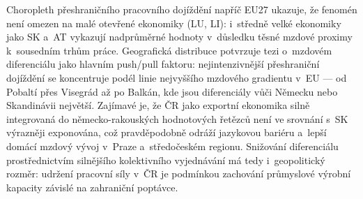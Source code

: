 Choropleth přeshraničního pracovního dojíždění napříč EU27 ukazuje, že fenomén není omezen na malé otevřené ekonomiky (LU, LI): i~středně velké ekonomiky jako SK a~AT vykazují nadprůměrné hodnoty v~důsledku těsné mzdové proximy k~sousedním trhům práce.
Geografická distribuce potvrzuje tezi o~mzdovém diferenciálu jako hlavním push/pull faktoru: nejintenzivnější přeshraniční dojíždění se koncentruje podél linie nejvyššího mzdového gradientu v~\ac{EU} --- od Pobaltí přes Visegrád až po Balkán, kde jsou diferenciály vůči Německu nebo Skandinávii největší.
Zajímavé je, že ČR jako exportní ekonomika silně integrovaná do německo-rakouských hodnotových řetězců není ve srovnání s~SK výrazněji exponována, což pravděpodobně odráží jazykovou bariéru a~lepší domácí mzdový vývoj v~Praze a~středočeském regionu.
Snižování diferenciálu prostřednictvím silnějšího kolektivního vyjednávání má tedy i~geopolitický rozměr: udržení pracovní síly v~ČR je podmínkou zachování průmyslové výrobní kapacity závislé na zahraniční poptávce.


